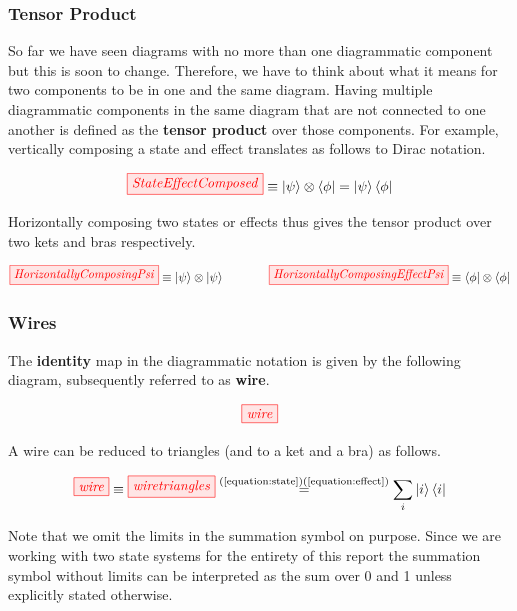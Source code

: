 \documentclass[]{article}
\newcommand{\equaltext}[1]{\ensuremath{\stackrel{\text{#1}}{=}}}
\begin{document}
\subsubsection{Tensor Product}
\label{section:tensorproduct}
So far we have seen diagrams with no more than one diagrammatic component but this is soon to change. Therefore, we have to think about what it means for two components to be in one and the same diagram. Having multiple diagrammatic components in the same diagram that are not connected to one another is defined as the \textbf{tensor product} over those components. For example, vertically composing a state and effect translates as follows to Dirac notation.

\begin{equation}
	\tikzfig{StateEffectComposed} \equiv \ket{\psi}\otimes\bra{\phi} = \ket{\psi}\bra{\phi}
\end{equation}

Horizontally composing two states or effects thus gives the tensor product over two kets and bras respectively.

\begin{equation}
	\tikzfig{HorizontallyComposingPsi} \equiv \ket{\psi} \otimes \ket{\psi} ~~~~~~~~~~~ \tikzfig{HorizontallyComposingEffectPsi} \equiv \bra{\phi} \otimes \bra{\phi}
\end{equation}

\subsubsection{Wires}
\label{identity}
The \textbf{identity} map in the diagrammatic notation is given by the following diagram, subsequently referred to as \textbf{wire}.

\begin{equation}
\tikzfig{wire}
\end{equation}

A wire can be reduced to triangles (and to a ket and a bra) as follows.

\begin{equation}
\label{equation:wiredecomposed}
\tikzfig{wire} \equiv \tikzfig{wiretriangles} \equaltext{(\ref{equation:state})(\ref{equation:effect})} \sum_{i}\ket{i}\bra{i}
\end{equation}

Note that we omit the limits in the summation symbol on purpose. Since we are working with two state systems for the entirety of this report the summation symbol without limits can be interpreted as the sum over 0 and 1 unless explicitly stated otherwise. 
\end{document}
